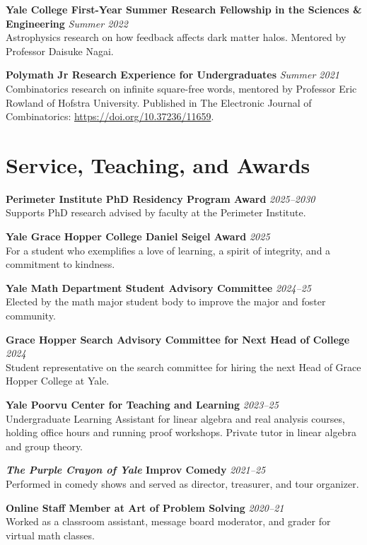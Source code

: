 \documentclass[11pt]{article}
\newcommand{\entry}[3]{
    \vspace{-.58em}
    \textbf{#1} \hfill \textit{#2} \\
    #3 \vspace{0.5em}}
\begin{document}
\entry{Yale College First-Year Summer Research Fellowship in the Sciences \& Engineering}{Summer 2022}{
Astrophysics research on how feedback affects dark matter halos. Mentored by Professor Daisuke Nagai.
}

\entry{Polymath Jr Research Experience for Undergraduates}{Summer 2021}{
Combinatorics research on infinite square-free words, mentored by Professor Eric Rowland of Hofstra University. Published in The Electronic Journal of Combinatorics: \href{https://doi.org/10.37236/11659}{https://doi.org/10.37236/11659}.
}

\section*{Service, Teaching, and Awards}
\vspace{0.58em}
\vspace{-0.1em}

\entry{Perimeter Institute PhD Residency Program Award}{2025--2030}{
Supports PhD research advised by faculty at the Perimeter Institute.
}

\entry{Yale Grace Hopper College Daniel Seigel Award}{2025}{
For a student who exemplifies a love of learning, a spirit of integrity, and a commitment to kindness.
}

\entry{Yale Math Department Student Advisory Committee}{2024--25}{
Elected by the math major student body to improve the major and foster community.
}

\entry{Grace Hopper Search Advisory Committee for Next Head of College}{2024}{
Student representative on the search committee for hiring the next Head of Grace Hopper College at Yale.
}

\entry{Yale Poorvu Center for Teaching and Learning}{2023--25}{
Undergraduate Learning Assistant for linear algebra and real analysis courses, holding office hours and running proof workshops. Private tutor in linear algebra and group theory.
}

\entry{\textit{The Purple Crayon of Yale} Improv Comedy}{2021--25}{
Performed in comedy shows and served as director, treasurer, and tour organizer.
}

\entry{Online Staff Member at Art of Problem Solving}{2020--21}{
Worked as a classroom assistant, message board moderator, and grader for virtual math classes.
}
\end{document}
